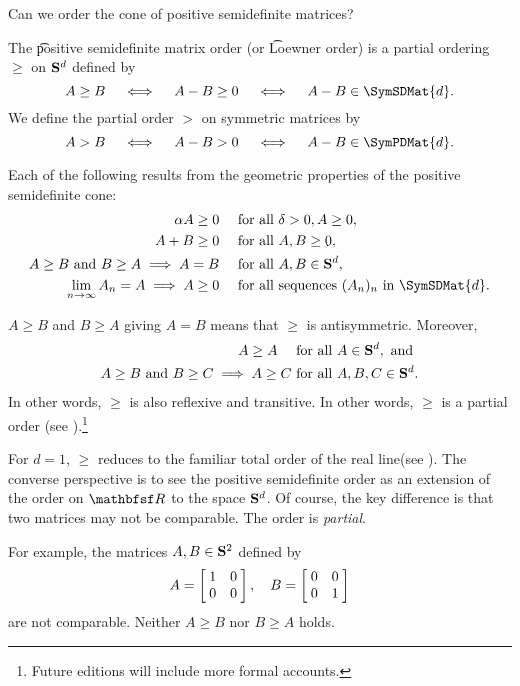 

Can we order the cone of positive semidefinite matrices?


The \t{positive semidefinite matrix order} (or \t{Loewner order}) is a partial ordering $\geq$ on $\mathbf{S}^{d}$ defined by
\[
  A \geq B \quad \iff \quad A - B \geq 0 \quad \iff \quad A - B \in \SymSDMat{d}.
\]
We define the partial order $>$ on symmetric matrices by
\[
  A > B \quad \iff \quad A - B > 0 \quad \iff \quad A - B \in \SymPDMat{d}.
\]



Each of the following results from the geometric properties of the positive semidefinite cone:
\[
\begin{aligned}
	\alpha A \geq 0 \quad & \text{ for all } \delta > 0, A \geq 0, \\
	A + B \geq 0 \quad & \text{ for all } A, B \geq 0, \\
	A \geq B \text{ and } B \geq A \implies A = B \quad & \text{ for all } A, B \in \SymMat{d}, \\
	\lim_{n \to \infty} A_n = A \implies A \geq 0 \quad & \text{ for all sequences } (A_n)_n \text{ in } \SymSDMat{d}.
\end{aligned}
\]


$A \geq B$ and $B \geq A$ giving $A = B$ means that $\geq$ is antisymmetric.
Moreover,
\[
\begin{aligned}
	A \geq A \quad & \text{ for all } A \in \mathbf{S}^{d}, \text{ and } \\
	A \geq B \text{ and } B \geq C \implies A \geq C & \text { for all }  A, B, C \in \mathbf{S}^{d}.
\end{aligned}
\]
In other words, $\geq$ is also reflexive and transitive.
In other words, $\geq$ is a partial order (see ).\footnote{Future editions will include more formal accounts.}

For $d = 1$, $\geq$ reduces to the familiar total order of the real line(see ).
The converse perspective is to see the positive semidefinite order as an extension of the order on $\R$ to the space $\mathbf{S}^{d}$.
Of course, the key difference is that two matrices may not be comparable.
The order is \textit{partial}.

For example, the matrices $A, B \in \mathbf{S}^{2}$ defined by
\[
	A = \bmat{1 & 0 \\ 0 & 0}, \quad B = \bmat{0 & 0 \\ 0 & 1}
\]
are not comparable.
Neither $A \geq B$ nor $B \geq A$ holds.

\blankpage

